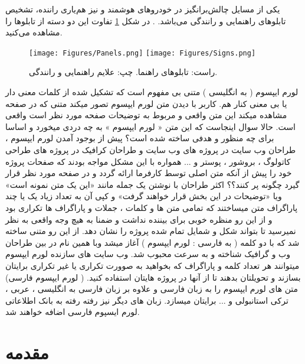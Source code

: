 \documentclass[oneside,openany,mscS]{SBU-Thesis}
\begin{document}
	یکی از مسایل چالش‌برانگیز در خودروهای هوشمند و نیز هم‌یاری راننده‌، تشخیص تابلوهای راهنمایی و رانندگی می‌باشد. \cite{Gonzalez2014}. در شکل
	\ref{fig:signs} 
	تفاوت این دو دسته از تابلوها را مشاهده می‌کنید.
	
	
	\begin{figure}[t]
		\centering
		\texttt{[image: Figures/Panels.png]}
		\texttt{[image: Figures/Signs.png]}
		\caption[تابلوی راهنما و علایم رانندگی]{راست: تابلوهای راهنما. چپ: علایم راهنمایی و رانندگی. }
		\label{fig:signs}
	\end{figure}
	
	لورم ایپسوم ( به انگلیسی  ) متنی بی مفهوم است که تشکیل شده از کلمات معنی دار یا بی معنی کنار هم. کاربر با دیدن متن لورم ایپسوم تصور میکند متنی که در صفحه مشاهده میکند این متن واقعی و مربوط به توضیحات صفحه مورد نظر است واقعی است. حالا سوال اینجاست که این متن « لورم ایپسوم » به چه دردی میخورد و اساسا برای چه منظور و هدفی ساخته شده است؟ پیش از بوجود آمدن لورم ایپسوم ، طراحان وب سایت در پروژه های وب سایت و طراحان کرافیک در پروژه های طراحی کاتولوگ ، بروشور ، پوستر و ... همواره با این مشکل مواجه بودند که صفحات پروژه خود را پیش از آنکه متن اصلی توسط کارفرما ارائه گردد و در صفحه مورد نظر قرار گیرد چگونه پر کنند؟؟ اکثر طراحان با نوشتن یک جمله مانند «این یک متن نمونه است» ویا «توضیحات در این بخش قرار خواهند گرفت» و کپی آن به تعداد زیاد یک یا چند پاراگراف متن میساختند که تمامی متن ها و کلمات ، جملات و پاراگراف ها تکراری بود و از این رو منظره خوبی برای بیننده نداشت و ضمنا به هیچ وجه واقعی به نظر نمیرسید تا بتواند شکل و شمایل تمام شده پروژه را نشان دهد. از این رو متنی ساخته شد که با دو کلمه ( به فارسی : لورم ایپسوم ) آغاز میشد وبا همین نام در بین طراحان وب و گرافیک شناخته و به سرعت محبوب شد. وب سایت های سازنده لورم ایپسوم میتوانند هر تعداد کلمه و پاراگراف که بخواهید به صوورت تکراری یا غیر تکراری برایتان بسازند و تحویلتان بدهند تا از آنها در پروژه هایتان استفاده کنید. ( لورم ایپسوم فارسی) متن های لورم ایپسوم را به زبان فارسی و علاوه بر زبان فارسی به انگلیسی ، عربی ، ترکی استانبولی و ... برایتان میسازد. زبان های دیگر نیز رفته رفته به بانک اطلاعاتی لورم ایسپوم فارسی اضافه خواهند شد.  
	
	
	\label{chap:lit}
	\section{مقدمه}
	
\end{document}
